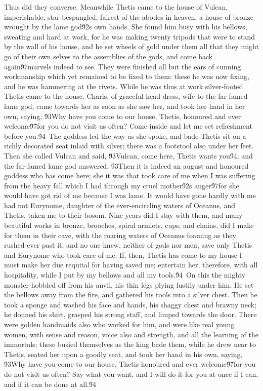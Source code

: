 {Thus did they converse. Meanwhile Thetis came to the house of Vulcan, imperishable, star-bespangled, fairest of the abodes in heaven, a house of bronze wrought by the lame god\'92s own hands. She found him busy with his bellows, sweating and hard at work, for he was making twenty tripods that were to stand by the wall of his house, and he set wheels of gold under them all that they might go of their own selves to the assemblies of the gods, and come back again\'97marvels indeed to see. They were finished all but the ears of cunning workmanship which yet remained to be fixed to them: these he was now fixing, and he was hammering at the rivets. While he was thus at work silver-footed Thetis came to the house. Charis, of graceful head-dress, wife to the far-famed lame god, came towards her as soon as she saw her, and took her hand in her own, saying, \'93Why have you come to our house, Thetis, honoured and ever welcome\'97for you do not visit us often? Come inside and let me set refreshment before you.\'94\
The goddess led the way as she spoke, and bade Thetis sit on a richly decorated seat inlaid with silver; there was a footstool also under her feet. Then she called Vulcan and said, \'93Vulcan, come here, Thetis wants you\'94; and the far-famed lame god answered, \'93Then it is indeed an august and honoured goddess who has come here; she it was that took care of me when I was suffering from the heavy fall which I had through my cruel mother\'92s anger\'97for she would have got rid of me because I was lame. It would have gone hardly with me had not Eurynome, daughter of the ever-encircling waters of Oceanus, and Thetis, taken me to their bosom. Nine years did I stay with them, and many beautiful works in bronze, brooches, spiral armlets, cups, and chains, did I make for them in their cave, with the roaring waters of Oceanus foaming as they rushed ever past it; and no one knew, neither of gods nor men, save only Thetis and Eurynome who took care of me. If, then, Thetis has come to my house I must make her due requital for having saved me; entertain her, therefore, with all hospitality, while I put by my bellows and all my tools.\'94\
On this the mighty monster hobbled off from his anvil, his thin legs plying lustily under him. He set the bellows away from the fire, and gathered his tools into a silver chest. Then he took a sponge and washed his face and hands, his shaggy chest and brawny neck; he donned his shirt, grasped his strong staff, and limped towards the door. There were golden handmaids also who worked for him, and were like real young women, with sense and reason, voice also and strength, and all the learning of the immortals; these busied themselves as the king bade them, while he drew near to Thetis, seated her upon a goodly seat, and took her hand in his own, saying, \'93Why have you come to our house, Thetis honoured and ever welcome\'97for you do not visit us often? Say what you want, and I will do it for you at once if I can, and if it can be done at all.\'94\
}
